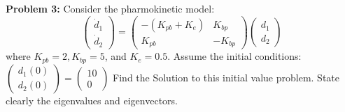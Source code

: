 \documentclass[12pt]{article}
\begin{document}
\noindent \textbf{Problem 3: }Consider the pharmokinetic model:
$$
	\begin{pmatrix}
		\dot{d}_1 \\
		\dot{d}_2
	\end{pmatrix} = 
	\begin{pmatrix}
		-(K_{pb} + K_e) & K_{bp} \\
		K_{pb} &  -K_{bp}
	\end{pmatrix} 
	\begin{pmatrix}
		d_1 \\
		d_2
	\end{pmatrix}
$$
where $K_{pb} = 2, K_{bp} = 5$, and $K_e = 0.5$. Assume the initial conditions: 
$
\begin{pmatrix}
	d_1(0) \\
	d_2(0)
\end{pmatrix} = 
\begin{pmatrix}
	10 \\ 
	0
\end{pmatrix}
$
Find the Solution to this initial value problem. State clearly the eigenvalues and eigenvectors.
\end{document}
